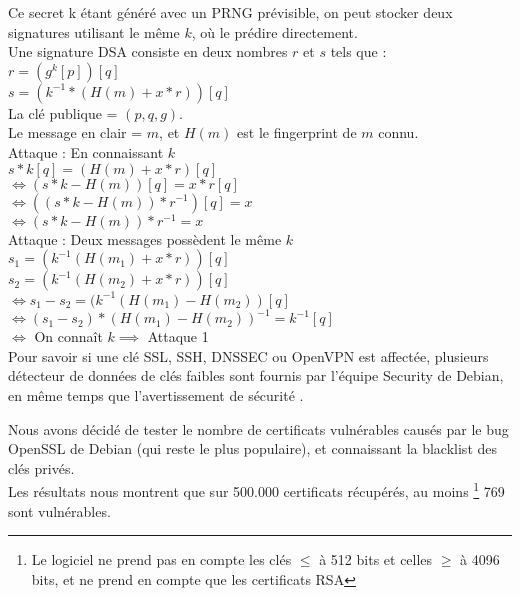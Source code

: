 		Ce secret k étant généré avec un PRNG prévisible, on peut stocker
		deux signatures utilisant le même $k$, où le prédire directement.\\
	
		Une signature DSA consiste en deux nombres $r$ et $s$ tels que :\\
		$r = (g^k [p]) [q]$\\
		$s = (k^{-1} * (H(m) + x * r)) [q]$\\
	
		La clé publique = $(p, q, g)$.\\
		Le message en clair = $m$, et $H(m)$ est le fingerprint de $m$ connu.\\
	
		Attaque  : En connaissant $k$	\\
		$s * k [q] = (H(m) + x*r) [q]$\\
		$\iff (s * k - H(m)) [q] = x*r [q]$\\
		$\iff ((s*k - H(m))*r^{-1})[q] = x$\\
		$\iff (s*k - H(m))*r^{-1} = x$\\

		Attaque  : Deux messages possèdent le même $k$\\
		$s_1 = (k^{-1} (H(m_1) + x*r)) [q]$\\
		$s_2 = (k^{-1} (H(m_2) + x*r)) [q]$\\
		$\iff s_1 - s_2 = (k^{-1} (H(m_1) - H(m_2)) [q]$\\
		$\iff (s_1 - s_2)*(H(m_1) - H(m_2))^{-1} = k^{-1} [q]$\\
		$\iff$ On connaît $k \implies$ Attaque 1\\

		Pour savoir si une clé SSL, SSH, DNSSEC ou OpenVPN est affectée, 
		plusieurs détecteur de données \cite{dowkd.pl} 
		\cite{openssl-blacklist} de clés faibles sont 
		fournis par l'équipe Security de Debian, en même temps que
		l'avertissement de sécurité \cite{debian2008bug}.\\ 


		Nous avons décidé de tester le nombre de certificats vulnérables 
		causés 	par le bug OpenSSL de Debian (qui reste le plus populaire), et
		connaissant la blacklist des clés privés. \\
	
		Les résultats nous montrent que sur 500.000 certificats récupérés, au moins
		\footnote{Le logiciel ne prend pas en compte les clés $\leq$ à 512 bits et 
		celles $\geq$ à 4096 bits, et ne prend en compte que les certificats RSA} 
		769 sont vulnérables.\\
		

